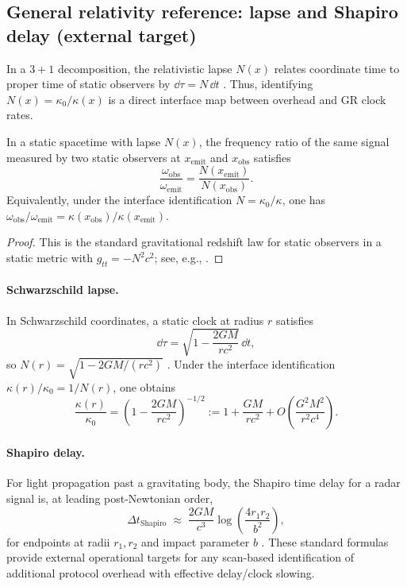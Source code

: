 \subsection{General relativity reference: lapse and Shapiro delay (external target)}
\label{app:gr_lapse_shapiro_target}

In a $3{+}1$ decomposition, the relativistic lapse $N(x)$ relates coordinate time to proper time of static observers by $\dd\tau=N\,\dd t$ \cite{Wald1984}.
Thus, identifying $N(x)=\kappa_0/\kappa(x)$ is a direct interface map between overhead and GR clock rates.

\begin{proposition}\label{prop:static_redshift_lapse}
In a static spacetime with lapse $N(x)$, the frequency ratio of the same signal measured by two static observers at $x_{\mathrm{emit}}$ and $x_{\mathrm{obs}}$ satisfies
\[
\frac{\omega_{\mathrm{obs}}}{\omega_{\mathrm{emit}}}=\frac{N(x_{\mathrm{emit}})}{N(x_{\mathrm{obs}})}.
\]
Equivalently, under the interface identification $N=\kappa_0/\kappa$, one has $\omega_{\mathrm{obs}}/\omega_{\mathrm{emit}}=\kappa(x_{\mathrm{obs}})/\kappa(x_{\mathrm{emit}})$.
\end{proposition}
\begin{proof}
This is the standard gravitational redshift law for static observers in a static metric with $g_{tt}=-N^2c^2$; see, e.g., \cite{Wald1984,Will1993}.
\end{proof}

\paragraph{Schwarzschild lapse.}
In Schwarzschild coordinates, a static clock at radius $r$ satisfies
\begin{equation}
\label{eq:schwarzschild_lapse}
\dd\tau=\sqrt{1-\frac{2GM}{rc^2}}\,\dd t,
\end{equation}
so $N(r)=\sqrt{1-2GM/(rc^2)}$ \cite{Wald1984}.
Under the interface identification $\kappa(r)/\kappa_0=1/N(r)$, one obtains
\begin{equation}
\label{eq:kappa_schwarzschild_series}
\frac{\kappa(r)}{\kappa_0}=\left(1-\frac{2GM}{rc^2}\right)^{-1/2}
:=1+\frac{GM}{rc^2}+O\!\left(\frac{G^2M^2}{r^2c^4}\right).
\end{equation}

\paragraph{Shapiro delay.}
For light propagation past a gravitating body, the Shapiro time delay for a radar signal is, at leading post-Newtonian order,
\begin{equation}
\label{eq:shapiro_delay}
\Delta t_{\mathrm{Shapiro}}\;\approx\;\frac{2GM}{c^3}\log\!\left(\frac{4r_1 r_2}{b^2}\right),
\end{equation}
for endpoints at radii $r_1,r_2$ and impact parameter $b$ \cite{Shapiro1964,Will1993}.
These standard formulas provide external operational targets for any scan-based identification of additional protocol overhead with effective delay/clock slowing.

